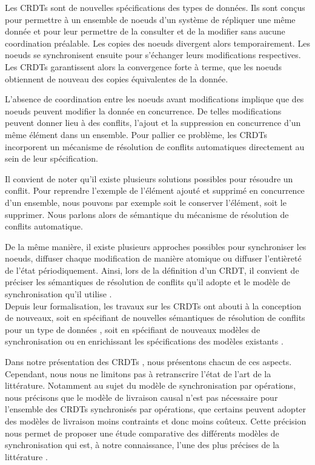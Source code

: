 Les \acfp{CRDT} \cite{shapiro_2011_crdt} sont de nouvelles spécifications des types de données.
Ils sont conçus pour permettre à un ensemble de noeuds d'un système de répliquer une même donnée et pour leur permettre de la consulter et de la modifier sans aucune coordination préalable.
Les copies des noeuds divergent alors temporairement.
Les noeuds se synchronisent ensuite pour s'échanger leurs modifications respectives.
Les \acp{CRDT} garantissent alors la convergence forte à terme, \ie que les noeuds obtiennent de nouveau des copies équivalentes de la donnée.

L'absence de coordination entre les noeuds avant modifications implique que des noeuds peuvent modifier la donnée en concurrence.
De telles modifications peuvent donner lieu à des conflits, \eg l'ajout et la suppression en concurrence d'un même élément dans un ensemble.
Pour pallier ce problème, les \acp{CRDT} incorporent un mécanisme de résolution de conflits automatiques directement au sein de leur spécification.

Il convient de noter qu'il existe plusieurs solutions possibles pour résoudre un conflit.
Pour reprendre l'exemple de l'élément ajouté et supprimé en concurrence d'un ensemble, nous pouvons par exemple soit le conserver l'élément, soit le supprimer.
Nous parlons alors de sémantique du mécanisme de résolution de conflits automatique.

De la même manière, il existe plusieurs approches possibles pour synchroniser les noeuds, \eg diffuser chaque modification de manière atomique ou diffuser l'entièreté de l'état périodiquement.
Ainsi, lors de la définition d'un \ac{CRDT}, il convient de préciser les sémantiques de résolution de conflits qu'il adopte et le modèle de synchronisation qu'il utilise \cite{2018-crdts-overview-preguica}.\\

Depuis leur formalisation, les travaux sur les \acp{CRDT} ont abouti à la conception de nouveaux, soit en spécifiant de nouvelles sémantiques de résolution de conflits pour un type de données \cite{2020-cl-set-weihai}, soit en spécifiant de nouveaux modèles de synchronisation \cite{Almeida_2018} ou en enrichissant les spécifications des modèles existants \cite{baquero2017pure,enes2019}.

Dans notre présentation des \acp{CRDT} , nous présentons chacun de ces aspects.
Cependant, nous nous ne limitons pas à retranscrire l'état de l'art de la littérature.
Notamment au sujet du modèle de synchronisation par opérations, nous précisons que le modèle de livraison causal n'est pas nécessaire pour l'ensemble des \acp{CRDT} synchronisés par opérations, \ie que certains peuvent adopter des modèles de livraison moins contraints et donc moins coûteux.
Cette précision nous permet de proposer une étude comparative des différents modèles de synchronisation qui est, à notre connaissance, l'une des plus précises de la littérature .\\

